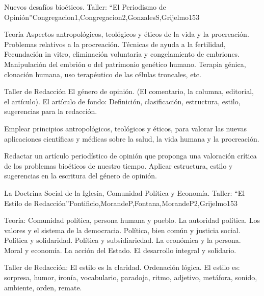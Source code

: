 \begin{syllabus}
\begin{unit}{Nuevos desafíos bioéticos. Taller: ``El Periodismo de Opinión''}{Congregacion1,Congregacion2,GonzalesS,Grijelmo}{15}{3}
\begin{topics}
	\item Teoría
 		\subitem Aspectos antropológicos, teológicos y éticos de la vida y la procreación. 
 		\subitem Problemas relativos a la procreación. Técnicas de ayuda a la fertilidad, Fecundación in vitro, eliminación voluntaria y congelamiento de embriones.
 		\subitem Manipulación del embrión o del patrimonio genético humano. Terapia génica, clonación humana, uso terapéutico de las células troncales, etc.
	\item Taller de Redacción
 		\subitem El género de opinión. (El comentario, la columna, editorial, el artículo).
 		\subitem El artículo de fondo: Definición, clasificación, estructura, estilo, sugerencias para la redacción.
\end{topics}
\begin{unitgoals}
	\item Emplear principios antropológicos, teológicos y éticos, para valorar las nuevas aplicaciones científicas y médicas sobre la salud, la vida humana y la procreación.
	\item Redactar un artículo periodístico de opinión que proponga una valoración crítica de los problemas bioéticos de nuestro tiempo. Aplicar estructura, estilo y sugerencias en la escritura del género de opinión.
\end{unitgoals}
\end{unit}

\begin{unit}{La Doctrina Social de la Iglesia, Comunidad Política y Economía. Taller: ``El Estilo de Redacción''}{Pontificio,MorandeP,Fontana,MorandeP2,Grijelmo}{15}{3}
\begin{topics}
	\item Teoría:
 		\subitem Comunidad política, persona humana y pueblo. La autoridad política. Los valores y el sistema de la democracia. Política, bien común y justicia social. Política y solidaridad. Política y subsidiariedad.
 		\subitem La económica y la persona. Moral y economía. La acción del Estado. El desarrollo integral y solidario.
	\item Taller de Redacción:
 		\subitem El estilo es la claridad. Ordenación lógica. El estilo es: sorpresa, humor, ironía, vocabulario, paradoja, ritmo, adjetivo, metáfora, sonido, ambiente, orden, remate.


\end{topics}
\end{unit}
\end{syllabus}
